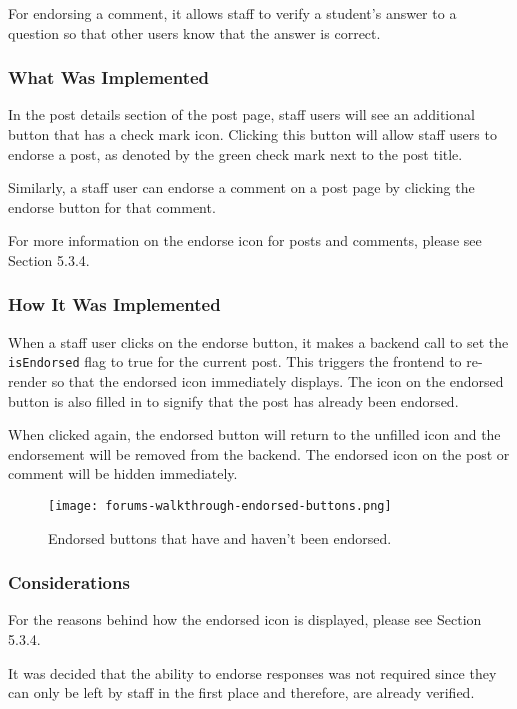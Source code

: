 For endorsing a comment, it allows staff to verify a student's answer to a question so that other users know that the answer is correct.

\subsubsection{What Was Implemented}
In the post details section of the post page, staff users will see an additional button that has a check mark icon.
Clicking this button will allow staff users to endorse a post, as denoted by the green check mark next to the post title.

Similarly, a staff user can endorse a comment on a post page by clicking the endorse button for that comment.

For more information on the endorse icon for posts and comments, please see Section 5.3.4.

\subsubsection{How It Was Implemented}
When a staff user clicks on the endorse button, it makes a backend call to set the \texttt{isEndorsed} flag to true for the current post.
This triggers the frontend to re-render so that the endorsed icon immediately displays.
The icon on the endorsed button is also filled in to signify that the post has already been endorsed.

When clicked again, the endorsed button will return to the unfilled icon and the endorsement will be removed from the backend.
The endorsed icon on the post or comment will be hidden immediately.

\begin{figure}[h!]
    \texttt{[image: forums-walkthrough-endorsed-buttons.png]}
    \centering
    \caption{Endorsed buttons that have and haven't been endorsed.}
\end{figure}

\subsubsection{Considerations}
For the reasons behind how the endorsed icon is displayed, please see Section 5.3.4.

It was decided that the ability to endorse responses was not required since they can only be left by staff in the first place and therefore, are already verified.